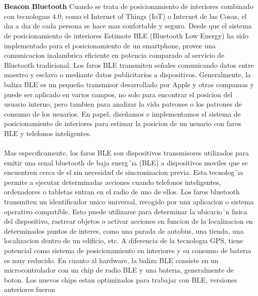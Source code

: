 \documentclass[conference,compsoc,onecolumn]{IEEEtran}
\begin{document}
\begin{itemize}
\\
\\

\end{itemize}


\textbf{Beacon Bluetooth} Cuando se trata de posicionamiento de interiores combinado con tecnologıas 4.0, como el Internet of  Things  (IoT)  o  Internet  de  las  Cosas,  el  dıa  a  dıa  de  cada  persona  se  hace  mas  confortable  y  seguro.  Desde que el sistema de posicionamiento de interiores Estimote BLE (Bluetooth Low Energy) ha sido implementado para el  posicionamiento  de  un  smartphone,  provee  una  comunicacion  inalambrica  eficiente  en  potencia  comparado  al servicio de Bluetooth tradicional. Los faros BLE transmiten señales comunicando datos entre maestro y esclavo o mediante datos publicitarios a dispositivos. Generalmente, la baliza BLE es un pequeño transmisor desarrollado por Apple  y  otras  companıas  y  puede  ser  aplicado  en  varios  campos,  no  solo  para  encontrar  el  posicion  del  usuario interno, pero tambien para analizar la vida patrones o los patrones de consumo de los usuarios. En papel, diseñamos e implementamos el sistema de posicionamiento de interiores para estimar la posicion de un usuario con faros BLE y telefonos inteligentes. 
\\
\\
Mas especıficamente, los faros BLE son dispositivos transmisores utilizados para emitir una senal bluetooth de baja energ´ıa  (BLE)  a  dispositivos  moviles  que  se  encuentren  cerca  de  el  sin  necesidad  de  sincronizacion  previa.  Esta tecnolog´ıa permite a ejecutar determinadas acciones cuando telefonos inteligentes, ordenadores o tabletas entran en el radio de uno de ellos.
Los  faros  bluetooth  transmiten  un  identificador  unico  universal,  recogido  por  una  aplicacion  o  sistema  operativo compatible.  Esto  puede  utilizarse  para  determinar  la  ubicacio´n  fısica  del  dispositivo,  rastrear  objetos  o  activar acciones en funcion de la localizacion en determinados puntos de interes, como una parada de autobus, una tienda, una  localizacion  dentro  de  un  edificio,  etc.  A  diferencia  de  la  tecnologıa  GPS,  tiene  potencial  como  sistema  de posicionamiento en interiores y su consumo de baterıa es muy reducido.
En cuanto al hardware, la baliza BLE consiste en un microcontrolador con un chip de radio BLE y una baterıa, generalmente  de  boton.  Los  nuevos  chips  estan  optimizados  para  trabajar  con  BLE,  versiones  anteriores  fueron
 
\end{document}
